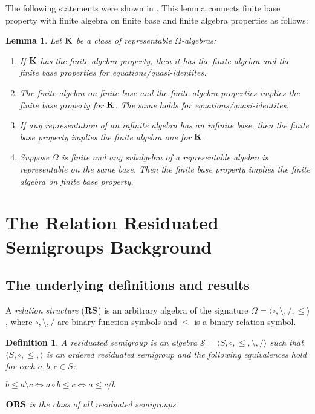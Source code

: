 \documentclass[a4paper]{article}
\theoremstyle{defin}
\newtheorem{defin}{Definition}
\theoremstyle{theorem}
\theoremstyle{prop}
\theoremstyle{lemma}
\newtheorem{lemma}{Lemma}
\theoremstyle{ex}
\theoremstyle{col}
\theoremstyle{claim}
\begin{document}
The following statements were shown in \cite{andreka1999finite}. This lemma connects finite base property with finite algebra on finite base and finite algebra properties as follows:
\begin{lemma}
  Let ${\bf K}$ be a class of representable $\Omega$-algebras:
  \begin{enumerate}
    \item If ${\bf K}$ has the finite algebra property, then it has the finite algebra and the finite base properties for equations/quasi-identites.
    \item The finite algebra on finite base and the finite algebra properties implies the finite base property for ${\bf K}$. The same holds for equations/quasi-identites.
    \item If any representation of an infinite algebra has an infinite base, then the finite base property implies the finite algebra one for ${\bf K}$.
    \item Suppose $\Omega$ is finite and any subalgebra of a representable algebra is representable on the same base. Then the finite base property implies the finite algebra on finite base property.
  \end{enumerate}
\end{lemma}

\section{The Relation Residuated Semigroups Background}

\subsection{The underlying definitions and results}

 A \emph{relation structure} (${\bf RS}$) is an arbitrary algebra of the signature $\Omega = \langle \circ, \setminus, /, \leq \rangle$, where $\circ, \setminus, /$ are binary function symbols and $\leq$ is a binary relation symbol.

\begin{defin}
  A residuated semigroup is an algebra $\mathcal{S} = \langle S, \circ, \leq, \setminus, / \rangle$ such that $\langle S, \circ, \leq, \rangle$ is an ordered residuated semigroup and the following equivalences hold for each $a, b, c \in S$:

  \begin{center}
    $b \leq a \setminus c \Leftrightarrow a \circ b \leq c \Leftrightarrow a \leq c / b$
  \end{center}
  ${\bf ORS}$ is the class of all residuated semigroups.
\end{defin}
\end{document}
